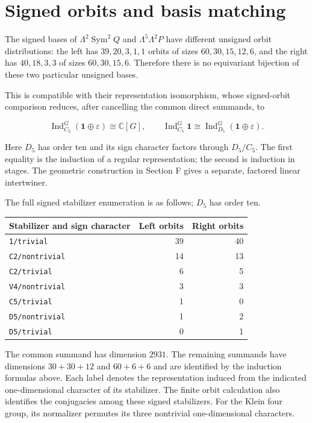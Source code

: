 \documentclass[11pt,a4paper]{article}
\begin{document}
\section{Signed orbits and basis matching}\label{sec:orbits}

The signed bases of \(\Lambda^2\operatorname{Sym}^2Q\) and \(\Lambda^5\Lambda^2P\) have different unsigned orbit distributions: the left has \(39,20,3,1,1\) orbits of sizes \(60,30,15,12,6\), and the right has \(40,18,3,3\) of sizes \(60,30,15,6\). Therefore there is no equivariant bijection of these two particular unsigned bases.

This is compatible with their representation isomorphism, whose signed-orbit comparison reduces, after cancelling the common direct summands, to

\[
\operatorname{Ind}_{C_2}^{G}(\mathbf1\oplus\varepsilon)\cong\mathbb C[G],\qquad
\operatorname{Ind}_{C_5}^{G}\mathbf1\cong
\operatorname{Ind}_{D_5}^{G}(\mathbf1\oplus\varepsilon).
\]

Here \(D_5\) has order ten and its sign character factors through \(D_5/C_5\). The first equality is the induction of a regular representation; the second is induction in stages. The geometric construction in Section F gives a separate, factored linear intertwiner.

The full signed stabilizer enumeration is as follows; \(D_5\) has order ten.

{\small
\begin{longtable}[]{@{}lrr@{}}
\toprule\noalign{}
Stabilizer and sign character & Left orbits & Right orbits \\
\midrule\noalign{}
\endhead
\bottomrule\noalign{}
\endlastfoot
\texttt{1/trivial} & 39 & 40 \\
\texttt{C2/nontrivial} & 14 & 13 \\
\texttt{C2/trivial} & 6 & 5 \\
\texttt{V4/nontrivial} & 3 & 3 \\
\texttt{C5/trivial} & 1 & 0 \\
\texttt{D5/nontrivial} & 1 & 2 \\
\texttt{D5/trivial} & 0 & 1 \\
\end{longtable}
}

The common summand has dimension \(2931\). The remaining summands have dimensions \(30+30+12\) and \(60+6+6\) and are identified by the induction formulas above. Each label denotes the representation induced from the indicated one-dimensional character of its stabilizer. The finite orbit calculation also identifies the conjugacies among these signed stabilizers. For the Klein four group, its normalizer permutes its three nontrivial one-dimensional characters.
\end{document}
